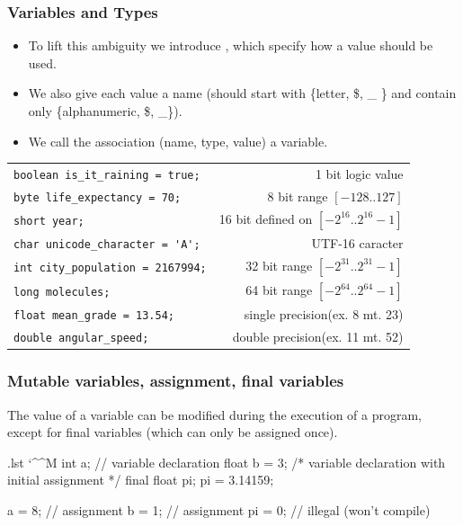 \documentclass[10pt,handout]{beamer}
\makeatletter
\newenvironment{code}{%
  \begingroup
  \@bsphack
  \immediate\openout\lstvrb@out\jobname.lst
  \let\do\@makeother\dospecials\catcode`\^^M\active
  \def\verbatim@processline{%
    \immediate\write\lstvrb@out{\the\verbatim@line}}%
  \verbatim@start}{%
  \immediate\closeout\lstvrb@out
  \@esphack
  \endgroup
  
  \begin{alertblock}{}
    
  \end{alertblock}}
\makeatother
\begin{document}
\begin{frame}[fragile]
  \frametitle{Variables and Types} 
  \begin{itemize}
  \item
  To lift this ambiguity we introduce ,
  which specify how a value should be used.
  \item
  We also give each value a name (should start with \{letter, \$, \_ \} and contain only \{alphanumeric, \$, \_\}).
  \item 
  We call the association (name, type, value) a variable.
  \end{itemize}

  \begin{example}
   \begin{longtable}{l|r}
   \lstinline!boolean is_it_raining = true;! & 1 bit logic value\\
   \pause
   \lstinline!byte life_expectancy = 70;! & 8 bit range $[-128..127]$ \\
   \lstinline!short year;! & 16 bit defined on $[-2^{16}..2^{16}-1]$ \\
   \lstinline!char unicode_character = 'A';! & UTF-16 caracter \\
   \pause 
   \lstinline!int city_population = 2167994;! & 32 bit range $[-2^{31}..2^{31}-1]$ \\ 
   \pause
   \lstinline!long molecules;! &  64 bit range $[-2^{64}..2^{64}-1]$ \\
   \hline
   \pause
   \lstinline!float mean_grade = 13.54;! & single precision(ex. 8 mt. 23) \\
   \lstinline!double angular_speed;! & double precision(ex. 11 mt. 52) \\ 
  \end{longtable}
\end{example}
\end{frame}


\begin{frame}[fragile]
  \frametitle{Mutable variables, assignment, final variables}
  
  The value of a variable can be modified during the execution of a program,
  except for final variables (which can only be assigned once). 

  \begin{code}
int a; // variable declaration
float b = 3; /* variable declaration with 
                initial assignment */
final float pi;
pi = 3.14159;

a = 8;  // assignment
b = 1;  // assignment
pi = 0; // illegal (won't compile) 
  \end{code}
\end{frame}
\end{document}
